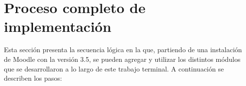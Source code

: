 
\section{Proceso completo de implementación}
\label{analisis:visionyuso}

 Esta sección presenta la secuencia lógica en la que, partiendo de una instalación
 de Moodle con la versión 3.5, se pueden agregar y utilizar los distintos módulos
 que se desarrollaron a lo largo de este trabajo terminal. A continuación se
 describen los pasos:

\newcommand{\Recomendacion}[2][Recomendación:]{%
}

